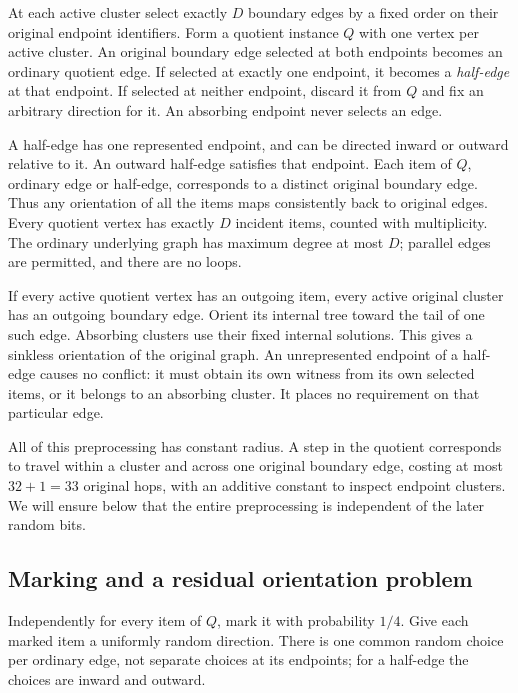 \documentclass[11pt]{article}
\theoremstyle{definition}
\begin{document}
At each active cluster select exactly $D$ boundary edges by a fixed order
on their original endpoint identifiers. Form a quotient instance $Q$ with
one vertex per active cluster. An original boundary edge selected at both
endpoints becomes an ordinary quotient edge. If selected at exactly one
endpoint, it becomes a \emph{half-edge} at that endpoint. If selected at
neither endpoint, discard it from $Q$ and fix an arbitrary direction for it.
An absorbing endpoint never selects an edge.

A half-edge has one represented endpoint, and can be directed inward or
outward relative to it. An outward half-edge satisfies that endpoint. Each
item of $Q$, ordinary edge or half-edge, corresponds to a distinct original
boundary edge. Thus any orientation of all the items maps consistently
back to original edges. Every quotient vertex has exactly $D$ incident
items, counted with multiplicity. The ordinary underlying graph has maximum
degree at most $D$; parallel edges are permitted, and there are no loops.

If every active quotient vertex has an outgoing item, every active original
cluster has an outgoing boundary edge. Orient its internal tree toward the
tail of one such edge. Absorbing clusters use their fixed internal solutions.
This gives a sinkless orientation of the original graph. An unrepresented
endpoint of a half-edge causes no conflict: it must obtain its own witness
from its own selected items, or it belongs to an absorbing cluster. It places
no requirement on that particular edge.

All of this preprocessing has constant radius. A step in the quotient
corresponds to travel within a cluster and across one original boundary
edge, costing at most $32+1=33$ original hops, with an additive constant
to inspect endpoint clusters. We will ensure below that the entire
preprocessing is independent of the later random bits.

\subsection{Marking and a residual orientation problem}

Independently for every item of $Q$, mark it with probability $1/4$. Give
each marked item a uniformly random direction. There is one common random
choice per ordinary edge, not separate choices at its endpoints; for a
half-edge the choices are inward and outward.
\end{document}

